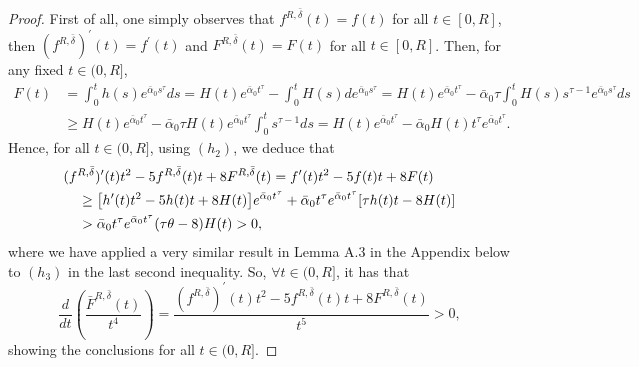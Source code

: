 \documentclass[11pt]{amsart}
\numberwithin{equation}{section}
\theoremstyle{definition}
\begin{document}
\begin{proof}
First of all, one simply observes that $f^{R,\bar{\delta}}(t)=f(t)$ for all $t\in[0,R]$,
then $(f^{R,\bar{\delta}})^\prime(t)=f^\prime(t)$ and $F^{R,\bar{\delta}}(t)=F(t)$ for all $t\in[0,R]$. Then,
for any fixed $t\in(0,R]$,
\begin{align*}
F(t)& =\int_0^th(s)e^{\bar{\alpha}_0s^\tau}ds=H(t)e^{\bar{\alpha}_0 t^\tau}
-\int_0^tH(s)d e^{\bar{\alpha}_0 s^\tau}=H(t)e^{\bar{\alpha}_0 t^\tau}
-\bar{\alpha}_0\tau \int_0^tH(s)s^{\tau-1} e^{\bar{\alpha}_0 s^\tau}ds \\
    &
\geq H(t)e^{\bar{\alpha}_0 t^\tau}
-\bar{\alpha}_0\tau H(t)e^{\bar{\alpha}_0 t^\tau} \int_0^ts^{\tau-1} ds
 =H(t)e^{\bar{\alpha}_0 t^\tau}
-\bar{\alpha}_0 H(t)t^\tau e^{\bar{\alpha}_0 t^\tau}.
\end{align*}
Hence, for all $t\in(0,R]$, using $(h_2)$, we deduce that
\[\begin{gathered}
  (f^{R,\bar{\delta}})^\prime(t)t^2-5f^{R,\bar{\delta}}(t)t+8F^{R,\bar{\delta}}(t)=f^\prime(t)t^2-5f(t)t+8F(t)\hfill\\
  \ \ \ \    \geq  \big[h^\prime(t)t^2-5h(t)t+8H(t)\big]e^{\bar{\alpha}_0 t^\tau}
+\bar{\alpha}_0 t^{\tau } e^{\bar{\alpha}_0 t^\tau}[\tau h(t)t-8H(t)]   \hfill\\
\ \ \ \  >\bar{\alpha}_0 t^{\tau } e^{\bar{\alpha}_0 t^\tau}(\tau\theta-8)H(t)>0,   \hfill\\
\end{gathered}\]
where we have applied a very similar result in Lemma A.3 in the Appendix below to $(h_3)$
in the last second inequality. So, $\forall t\in(0,R]$, it has that
\begin{equation}\label{monotone1}
 \frac d{dt}\left(\frac{\bar{F}^{R,\bar{\delta}}(t)}{t^{4}} \right)
=\frac{(f^{R,\bar{\delta}})^\prime(t)t^2-5f^{R,\bar{\delta}}(t)t+8F^{R,\bar{\delta}}(t)}{t^5}>0,
\end{equation}
showing the conclusions for all $t\in(0,R]$.


\end{proof}
\end{document}
